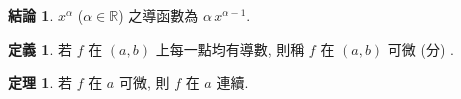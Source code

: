 \documentclass[12pt]{extarticle}
\newcommand{\ds}{\displaystyle}
\theoremstyle{definition}
\newtheorem*{dfn}{定義}
\newtheorem*{fact}{結論}
\newtheorem*{thm}{定理}
\newtheorem*{rmk}{註}
\begin{document}
\begin{fact}
  $x^\alpha$ ($\alpha\in\mathbb{R}$) 之導函數為 $\alpha\,x^{\alpha - 1}$. 
\end{fact}

\begin{dfn}
      若 $f$ 在 $(a, b)$ 上每一點均有導數, 則稱 $f$ 在 $(a, b)$ 可微 (分) . 
\end{dfn}

\begin{thm}
  若 $f$ 在 $a$ 可微, 則 $f$ 在 $a$ 連續. 
\end{thm}

\end{document}
